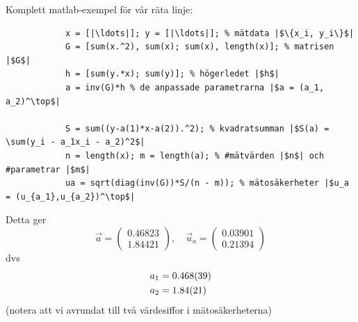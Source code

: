 \documentclass[9pt]{beamer}
\begin{document}
    \begin{frame}[fragile]
        Komplett matlab-exempel för vår räta linje:

        \begin{verbatim}
            x = [|\ldots|]; y = [|\ldots|]; % mätdata |$\{x_i, y_i\}$|
            G = [sum(x.^2), sum(x); sum(x), length(x)]; % matrisen |$G$|
            h = [sum(y.*x); sum(y)]; % högerledet |$h$|
            a = inv(G)*h % de anpassade parametrarna |$a = (a_1, a_2)^\top$|

            S = sum((y-a(1)*x-a(2)).^2); % kvadratsumman |$S(a) = \sum(y_i - a_1x_i - a_2)^2$|
            n = length(x); m = length(a); % #mätvärden |$n$| och #parametrar |$m$|
            ua = sqrt(diag(inv(G))*S/(n - m)); % mätosäkerheter |$u_a = (u_{a_1},u_{a_2})^\top$|
        \end{verbatim}

        \vfill
        Detta ger
        \begin{equation*}
            \vec a =
            \begin{pmatrix}
                0.46823 \\
                1.84421
            \end{pmatrix},\quad
            \vec u_a =
            \begin{pmatrix}
                0.03901 \\
                0.21394
            \end{pmatrix}
        \end{equation*}
        dvs
        \begin{align*}
            a_1 &= \num{0.468\pm0.039} \\
            a_2 &= \num{1.84\pm0.21}
        \end{align*}
        (notera att vi avrundat till två värdesiffor i mätosäkerheterna)
    \end{frame}
\end{document}
